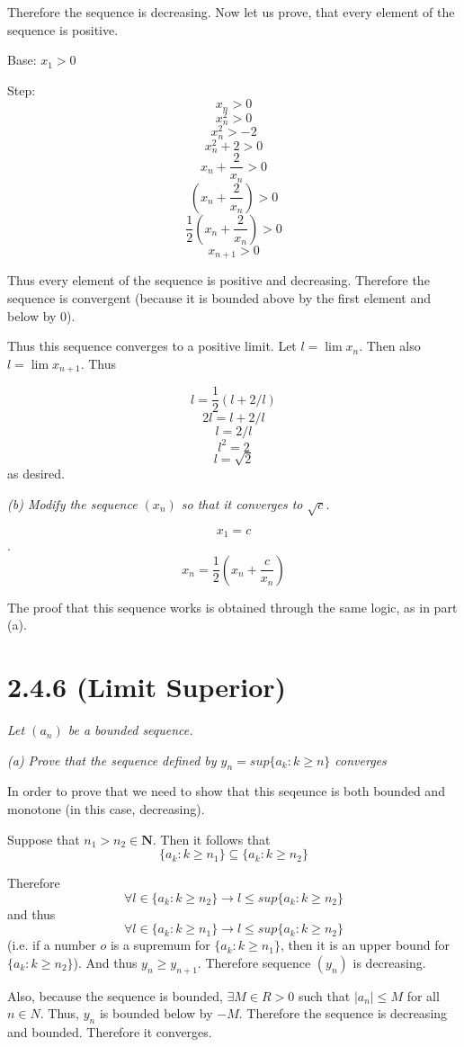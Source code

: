 \documentclass[11pt,oneside,titlepage]{article}
\begin{document}
Therefore the sequence is decreasing. Now let us prove, that every element of the
sequence is positive.

Base: $x_1 > 0$

Step:
$$x_n> 0$$
$$x_n^2 > 0$$
$$x_n^2 > -2$$
$$x_n^2 + 2 > 0$$
$$x_n + \frac{2}{x_n} > 0$$
$$(x_n + \frac{2}{x_n}) > 0$$
$$\frac{1}{2}(x_n + \frac{2}{x_n}) > 0$$
$$x_{n + 1} > 0$$

Thus every element of the sequence is positive and decreasing. Therefore the
sequence is convergent (because it is bounded above by the first element and
below by 0).

Thus this sequence converges to a positive limit. Let $l = \lim x_n$. Then also
$l = \lim x_{n + 1}$. Thus

$$l = \frac{1}{2}(l + 2/l)$$
$$2 l = l + 2/l$$
$$l = 2/l$$
$$l^2 = 2$$
$$l = \sqrt{2}$$
as desired.

\textit{(b) Modify the sequence $(x_n)$ so that it converges to $\sqrt{c}$. }

$$x_1 = c$$.
$$x_n =  \frac{1}{2}(x_n + \frac{c}{x_n})$$

The proof that this sequence works is obtained through the same logic, as in part (a).

\section*{2.4.6 (Limit Superior)}
\textit{Let $(a_n)$ be a bounded sequence.}

\textit{(a) Prove that the sequence defined by $y_n = sup\{a_k: k \geq n\}$
  converges}

In order to prove that we need to show that this seqeunce is both bounded and
monotone (in this case, decreasing).

Suppose that $n_1 > n_2 \in \textbf{N}$. Then it follows that
$$\{a_k: k \geq n_1\} \subseteq \{a_k: k \geq n_2\}$$

Therefore 
$$\forall l \in \{a_k: k \geq n_2\} \to l \leq sup\{a_k: k \geq n_2\}$$
and thus
$$\forall l \in \{a_k: k \geq n_1\} \to l \leq sup\{a_k: k \geq n_2\}$$
(i.e. if a number $o$ is a supremum for $\{a_k: k \geq n_1\}$, then
it is an upper bound for $\{a_k: k \geq n_2\}$).
And thus $y_n \geq y_{n + 1}$. Therefore sequence $(y_n)$ is decreasing.

Also, because the sequence is bounded, $\exists M \in R > 0$ such that
$|a_n| \leq M$ for all $n \in N$. Thus, $y_n$ is bounded below by $-M$.
Therefore the sequence is decreasing and bounded. Therefore it converges.
\end{document}
